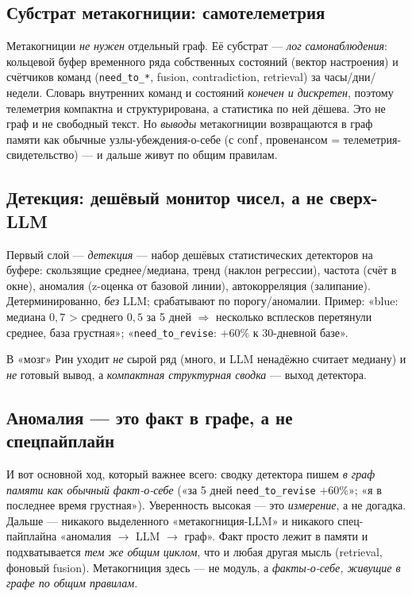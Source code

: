 \subsection*{Субстрат метакогниции: самотелеметрия}

Метакогниции \emph{не нужен} отдельный граф. Её субстрат — \emph{лог
самонаблюдения}: кольцевой буфер временного ряда собственных состояний (вектор
настроения) и счётчиков команд (\texttt{need\_to\_*}, fusion, contradiction,
retrieval) за часы/дни/недели. Словарь внутренних команд и состояний \emph{конечен
и дискретен}, поэтому телеметрия компактна и структурирована, а статистика по ней
дёшева. Это не граф и не свободный текст. Но \emph{выводы} метакогниции возвращаются
в граф памяти как обычные узлы-убеждения-о-себе (с $\mathrm{conf}$, провенансом = телеметрия-
свидетельство) — и дальше живут по общим правилам.

\subsection*{Детекция: дешёвый монитор чисел, а не сверх-LLM}

Первый слой — \emph{детекция} — набор дешёвых статистических детекторов на буфере:
скользящие среднее/медиана, тренд (наклон регрессии), частота (счёт в окне),
аномалия (z-оценка от базовой линии), автокорреляция (залипание). Детерминированно,
\emph{без} LLM; срабатывают по порогу/аномалии. Пример: «blue: медиана $0{,}7$ >
среднего $0{,}5$ за 5 дней $\Rightarrow$ несколько всплесков перетянули среднее, база
грустная»; «\texttt{need\_to\_revise}: $+60\%$ к 30-дневной базе».

В «мозг» Рин уходит \emph{не} сырой ряд (много, и LLM ненадёжно считает медиану) и
\emph{не} готовый вывод, а \emph{компактная структурная сводка} — выход детектора.

\subsection*{Аномалия — это факт в графе, а не спецпайплайн}

И вот основной ход, который важнее всего: сводку детектора пишем \emph{в граф памяти
как обычный факт-о-себе} («за 5 дней \texttt{need\_to\_revise} $+60\%$»; «я в
последнее время грустная»). Уверенность высокая — это \emph{измерение}, а не
догадка. Дальше — никакого выделенного «метакогниция-LLM» и никакого спец-пайплайна
«аномалия $\to$ LLM $\to$ граф». Факт просто лежит в памяти и подхватывается
\emph{тем же общим циклом}, что и любая другая мысль (retrieval, фоновый fusion).
Метакогниция здесь — не модуль, а \emph{факты-о-себе, живущие в графе по общим
правилам}.

